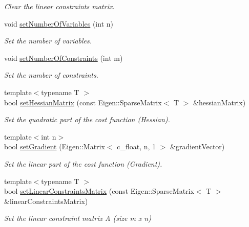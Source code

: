 \begin{DoxyCompactItemize}
\begin{DoxyCompactList}\small\item\em Clear the linear constraints matrix. \end{DoxyCompactList}\item 
void \hyperlink{classOSQPWrapper_1_1OptimizerData_a5da83359faaeac29332152aa83cc5ad3}{set\+Number\+Of\+Variables} (int n)
\begin{DoxyCompactList}\small\item\em Set the number of variables. \end{DoxyCompactList}\item 
void \hyperlink{classOSQPWrapper_1_1OptimizerData_ab0c21f364d2171c6d0cf3177b3193128}{set\+Number\+Of\+Constraints} (int m)
\begin{DoxyCompactList}\small\item\em Set the number of constraints. \end{DoxyCompactList}\item 
{\footnotesize template$<$typename T $>$ }\\bool \hyperlink{classOSQPWrapper_1_1OptimizerData_aa6914d351eb335de65481ff49e48b3aa}{set\+Hessian\+Matrix} (const Eigen\+::\+Sparse\+Matrix$<$ T $>$ \&hessian\+Matrix)
\begin{DoxyCompactList}\small\item\em Set the quadratic part of the cost function (Hessian). \end{DoxyCompactList}\item 
{\footnotesize template$<$int n$>$ }\\bool \hyperlink{classOSQPWrapper_1_1OptimizerData_a36ed84071fa58564b998b7db2efc5d5c}{set\+Gradient} (Eigen\+::\+Matrix$<$ c\+\_\+float, n, 1 $>$ \&gradient\+Vector)
\begin{DoxyCompactList}\small\item\em Set the linear part of the cost function (Gradient). \end{DoxyCompactList}\item 
{\footnotesize template$<$typename T $>$ }\\bool \hyperlink{classOSQPWrapper_1_1OptimizerData_acba80bfc485a72bfe423a39ab5895c19}{set\+Linear\+Constraints\+Matrix} (const Eigen\+::\+Sparse\+Matrix$<$ T $>$ \&linear\+Constraints\+Matrix)
\begin{DoxyCompactList}\small\item\em Set the linear constraint matrix A (size m x n) \end{DoxyCompactList}\item 

\end{DoxyCompactItemize}
